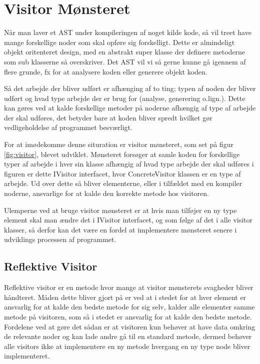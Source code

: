 \section{Visitor Mønsteret}\label{sec:visitor}


Når man laver et AST under kompileringen af noget kilde kode, så vil treet have mange forskellige noder som skal opføre sig forskelligt. Dette er almindeligt objekt oritenteret design, med en abstrakt super klasse der definere metoderne som sub klasserne så overskriver. Det AST vil vi så gerne kunne gå igennem af flere grunde, fx for at analysere koden eller generere objekt koden. 

Så det arbejde der bliver udført er afhænging af to ting; typen af noden der bliver udført og hvad type arbejde der er brug for (analyse, generering o.lign.). Dette kan gøres ved at kalde forskellige metoder på noderne afhængig af type af arbejde der skal udføres, det betyder bare at koden bliver spredt hvilket gør vedligeholdelse af programmet besværligt.


\noindent For at imødekomme denne situration er visitor mønsteret, som set på figur \ref{fig:visitor}, blevet udviklet. Mønsteret forsøger at samle koden for forskellige typer af arbejde i hver sin klasse afhængig af hvad type arbejde der skal udføres i figuren er dette IVisitor interfacet, hvor ConcreteVisitor klassen er en type af arbejde. Ud over dette så bliver elementerne, eller i tilfældet med en kompiler noderne, ansvarlige for at kalde den korrekte metode hos visitoren.

Ulemperne ved at bruge visitor mønsteret er at hvis man tilføjer en ny type element skal man ændre det i IVisitor interfacet, og som følge af det i alle visitor klasser, så derfor kan det være en fordel at implementere mønsteret senere i udviklings processen af programmet.

\subsection{Reflektive Visitor}\label{ssec:refvisitor}

Reflektive visitor er en metode hvor mange at visitor mønsterets svagheder bliver håndteret. Måden dette bliver gjort på er ved at i stedet for at hver element er ansvarlig for at kalde den bedste metode for sig selv, kalder alle elementer samme metode på visitoren, som så i stedet er ansvarlig for at kalde den bedste metode. Fordelene ved at gøre det sådan er at visitoren kun behøver at have data omkring de relevante noder og kan lade andre gå til en standard metode, dermed behøver alle visitors ikke at implementere en ny metode hvergang en ny type node bliver implementeret.